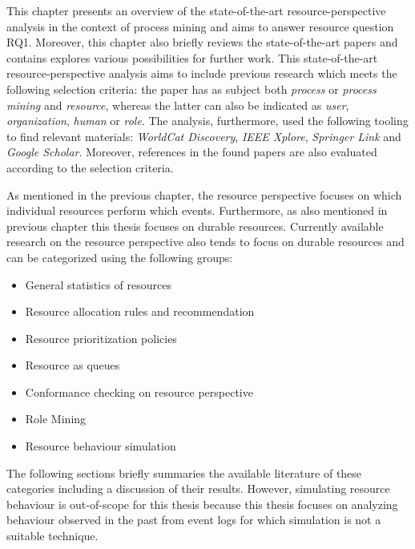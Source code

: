 \label{section:resourceperspective} 
This chapter presents an overview of the state-of-the-art resource-perspective analysis in the context of process mining and aims to answer resource question RQ1. Moreover, this chapter also briefly reviews the state-of-the-art papers and contains explores various possibilities for further work. This state-of-the-art resource-perspective analysis aims to include previous research which meets the following selection criteria: the paper has as subject both \textit{process} or \textit{process mining} and \textit{resource}, whereas the latter can also be indicated as \textit{user}, \textit{organization}, \textit{human} or \textit{role}. The analysis, furthermore, used the following tooling to find relevant materials: \textit{WorldCat Discovery}, \textit{IEEE Xplore}, \textit{Springer Link} and \textit{Google Scholar}. Moreover, references in the found papers are also evaluated according to the selection criteria. 

As mentioned in the previous chapter, the resource perspective focuses on which individual resources perform which events. Furthermore, as also mentioned in previous chapter this thesis focuses on durable resources. Currently available research on the resource perspective also tends to focus on durable resources and can be categorized using the following groups: 

\begin{itemize}
\item General statistics of resources
\item Resource allocation rules and recommendation
\item Resource prioritization policies
\item Resource as queues
\item Conformance checking on resource perspective
\item Role Mining
\item Resource behaviour simulation 
\end{itemize} 

The following sections briefly summaries the available literature of these categories including a discussion of their results. However, simulating resource behaviour is out-of-scope for this thesis because this thesis focuses on analyzing behaviour observed in the past from event logs for which simulation is not a suitable technique. 

